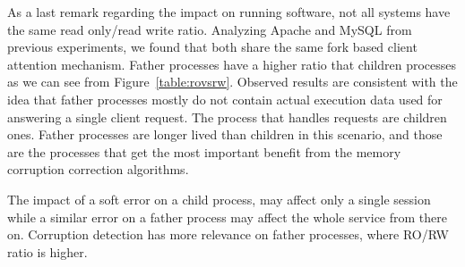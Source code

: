 As a last remark regarding the impact on running software, not all systems have the same read only/read write ratio.
Analyzing Apache and MySQL from previous experiments, we found that both share the same fork based client attention mechanism. 
Father processes have a higher ratio that children processes as we can see from Figure~\ref{table:rovsrw}.
Observed results are consistent with the idea that father processes mostly do not contain actual execution data used for answering a single client request.
The process that handles requests are children ones.
Father processes are longer lived than children in this scenario, and those are the processes that get the most important benefit from the memory corruption correction algorithms.

The impact of a soft error on a child process, may affect only a single session while a similar error on a father process may affect the whole service from there on.
Corruption detection has more relevance on father processes, where RO/RW ratio is higher.
